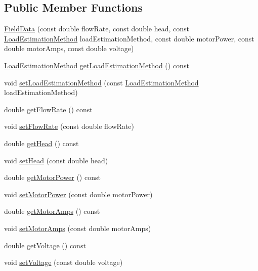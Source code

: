 \subsection*{Public Member Functions}
\begin{DoxyCompactItemize}
\item 
\hyperlink{class_field_data_a43df27dd87a19f495f7eb82729de9e31}{Field\+Data} (const double flow\+Rate, const double head, const \hyperlink{class_field_data_a424e89914ba5684c01bb269dbe3312fd}{Load\+Estimation\+Method} load\+Estimation\+Method, const double motor\+Power, const double motor\+Amps, const double voltage)
\item 
\hyperlink{class_field_data_a424e89914ba5684c01bb269dbe3312fd}{Load\+Estimation\+Method} \hyperlink{class_field_data_ae213fa76dd005d7fd251ef26beecd311}{get\+Load\+Estimation\+Method} () const
\item 
void \hyperlink{class_field_data_a0c820da908989c650ebe5e9be640fd85}{set\+Load\+Estimation\+Method} (const \hyperlink{class_field_data_a424e89914ba5684c01bb269dbe3312fd}{Load\+Estimation\+Method} load\+Estimation\+Method)
\item 
double \hyperlink{class_field_data_a59b3261a5162b002d7b73a2d35561bd0}{get\+Flow\+Rate} () const
\item 
void \hyperlink{class_field_data_a35231cce497c4b69b683d76dd2c78991}{set\+Flow\+Rate} (const double flow\+Rate)
\item 
double \hyperlink{class_field_data_ac3e8e0b2de226c858b6c92cdb454bd0d}{get\+Head} () const
\item 
void \hyperlink{class_field_data_af36f740ce0eb703903a18b5e2d8e0571}{set\+Head} (const double head)
\item 
double \hyperlink{class_field_data_a3e8e1bf84bbd00b9b52b803147968c81}{get\+Motor\+Power} () const
\item 
void \hyperlink{class_field_data_a0263d25bc216482b0663b02d0af680a8}{set\+Motor\+Power} (const double motor\+Power)
\item 
double \hyperlink{class_field_data_ad2b4fffb00fa7cfa6f69487e1034989a}{get\+Motor\+Amps} () const
\item 
void \hyperlink{class_field_data_a9139b100e363d8a632669ac5d6ee7152}{set\+Motor\+Amps} (const double motor\+Amps)
\item 
double \hyperlink{class_field_data_a1e8a55965e6cbd8c7b49c0dd5fbee002}{get\+Voltage} () const
\item 
void \hyperlink{class_field_data_a8e610f5861b66a36b1e4df2047d21245}{set\+Voltage} (const double voltage)
\end{DoxyCompactItemize}


